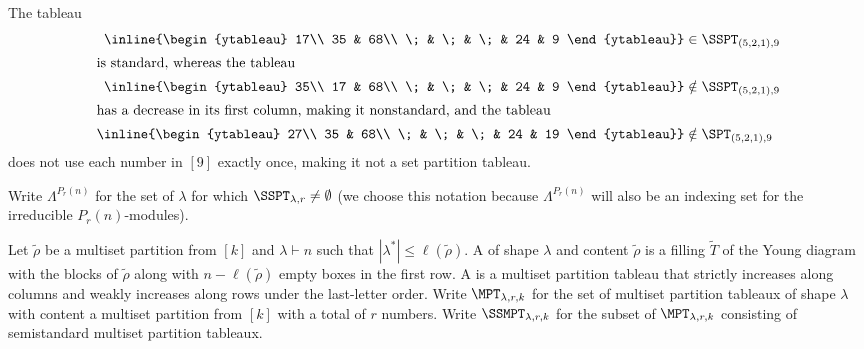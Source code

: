 \begin{exam}The tableau
    \begin{align*}
\inline{\begin{ytableau}
        17\\
        35 & 68\\
        \; & \; & \; & 24 & 9
\end{ytableau}}&\in\SSPT_{(5,2,1),9}\\
        \intertext{is standard, whereas the tableau}
        \inline{\begin{ytableau}
        35\\
        17 & 68\\
        \; & \; & \; & 24 & 9
\end{ytableau}}&\notin\SSPT_{(5,2,1),9}\\
        \intertext{has a decrease in its first column, making it nonstandard, and the tableau}
        \inline{\begin{ytableau}
        27\\
        35 & 68\\
        \; & \; & \; & 24 & 19
\end{ytableau}}&\notin\SPT_{(5,2,1),9}\\
    \end{align*} does not use each number in $[9]$ exactly once, making it not a set partition tableau.
\end{exam}

Write $\Lambda^{P_r(n)}$ for the set of $\lambda$ for which $\SSPT_{\lambda,r}\neq\emptyset$ (we choose this notation because $\Lambda^{P_r(n)}$ will also be an indexing set for the irreducible $P_r(n)$-modules).

Let $\tilde\rho$ be a multiset partition from $[k]$ and $\lambda\vdash n$ such that $|\lambda^*|\leq\ell(\tilde\rho)$. A  of shape $\lambda$ and content $\tilde\rho$ is a filling $\tilde{T}$ of the Young diagram with the blocks of $\tilde\rho$ along with $n-\ell(\tilde\rho)$ empty boxes in the first row. A  is a multiset partition tableau that strictly increases along columns and weakly increases along rows under the last-letter order. Write $\MPT_{\lambda,r,k}$ for the set of multiset partition tableaux of shape $\lambda$ with content a multiset partition from $[k]$ with a total of $r$ numbers. Write $\SSMPT_{\lambda,r,k}$ for the subset of $\MPT_{\lambda,r,k}$ consisting of semistandard multiset partition tableaux.

